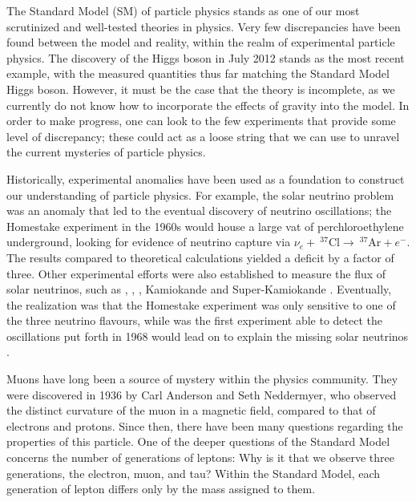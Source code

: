 \label{chapter:introduction}

The Standard Model (SM) of particle physics stands as one of our most scrutinized and well-tested theories in physics.
Very few discrepancies have been found between the model and reality, within the realm of experimental particle physics.
The discovery of the Higgs boson in July 2012 stands as the most recent example, with the measured quantities thus far matching the Standard Model Higgs boson.
However, it must be the case that the theory is incomplete, as we currently do not know how to incorporate the effects of gravity into the model.
In order to make progress, one can look to the few experiments that provide some level of discrepancy; these could act as a loose string that we can use to unravel the current mysteries of particle physics.

Historically, experimental anomalies have been used as a foundation to construct our understanding of particle physics.
For example, the solar neutrino problem was an anomaly that led to the eventual discovery of neutrino oscillations; the Homestake experiment \cite{Davis:1968cp} in the 1960s would house a large vat of perchloroethylene underground, looking for evidence of neutrino capture via $\nu_e +~^{37}\textrm{Cl} \rightarrow~^{37}\textrm{Ar} + e^-$.
The results compared to theoretical calculations yielded a deficit by a factor of three.
Other experimental efforts were also established to measure the flux of solar neutrinos, such as \sage \cite{Abdurashitov:1999zd}, \gallex \cite{Hampel:1998xg}, \sno \cite{Boger:1999bb}, Kamiokande and Super-Kamiokande \cite{Fukuda:1996sz, Fukuda:2002pe}.
Eventually, the realization was that the Homestake experiment was only sensitive to one of the three neutrino flavours, while \sno was the first experiment able to detect the oscillations put forth in 1968 would lead on to explain the missing solar neutrinos \cite{Gribov:1968kq}.

Muons have long been a source of mystery within the physics community.
They were discovered in 1936 by Carl Anderson and Seth Neddermyer, who observed the distinct curvature of the muon in a magnetic field, compared to that of electrons and protons. Since then, there have been many questions regarding the properties of this particle.
One of the deeper questions of the Standard Model concerns the number of generations of leptons: Why is it that we observe three generations, the electron, muon, and tau? Within the Standard Model, each generation of lepton differs only by the mass assigned to them.

